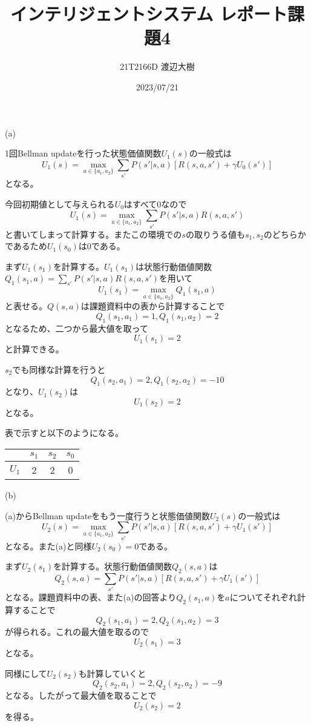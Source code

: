 \documentclass[a4paper,11pt,dvipdfmx]{jsarticle}
\begin{document}
\title{インテリジェントシステム レポート課題4}
\author{21T2166D 渡辺大樹}
\date{2023/07/21}
\maketitle

\section{}
(a)

1回Bellman updateを行った状態価値関数$U_1(s)$の一般式は
\[U_1(s)=\max_{a\in\{a_1,a_2\}}\sum_{s'}P(s'|s,a)[R(s,a,s')+\gamma U_0(s')]\]
となる。

今回初期値として与えられる$U_0$はすべて0なので
\[U_1(s)=\max_{a\in\{a_1,a_2\}}\sum_{s'}P(s'|s,a)R(s,a,s')\]
と書いてしまって計算する。またこの環境での$s$の取りうる値も$s_1,s_2$のどちらかであるため$U_1(s_0)$は0である。

まず$U_1(s_1)$を計算する。$U_1(s_1)$は状態行動価値関数$Q_1(s_1,a)=\sum_{s'}P(s'|s,a)R(s,a,s')$を用いて
\[U_1(s_1)=\max_{a\in\{a_1,a_2\}}Q_1(s_1,a)\]
と表せる。$Q(s,a)$は課題資料中の表から計算することで
\[Q_1(s_1,a_1)=1,Q_1(s_1,a_2)=2\]
となるため、二つから最大値を取って
\[U_1(s_1)=2\]
と計算できる。

$s_2$でも同様な計算を行うと
\[Q_1(s_2,a_1)=2,Q_1(s_2,a_2)=-10\]
となり、$U_1(s_2)$は
\[U_1(s_2)=2\]
となる。

表で示すと以下のようになる。
\begin{center}
    \begin{tabular}[h]{|c|c|c|c|} \hline
              & $s_1$ & $s_2$ & $s_0$ \\ \hline
        $U_1$ &   2   &   2   &   0   \\ \hline
    \end{tabular}
\end{center}

(b)

(a)からBellman updateをもう一度行うと状態価値関数$U_2(s)$の一般式は
\[U_2(s)=\max_{a\in\{a_1,a_2\}}\sum_{s'}P(s'|s,a)[R(s,a,s')+\gamma U_1(s')]\]
となる。また(a)と同様$U_2(s_0)=0$である。

まず$U_2(s_1)$を計算する。状態行動価値関数$Q_2(s,a)$は
\[Q_2(s,a)=\sum_{s'}P(s'|s,a)[R(s,a,s')+\gamma U_1(s')]\]
となる。課題資料中の表、また(a)の回答より$Q_2(s_1,a)$を$a$についてそれぞれ計算することで
\[Q_2(s_1,a_1)=2,Q_2(s_1,a_2)=3\]
が得られる。これの最大値を取るので
\[U_2(s_1)=3\]
となる。

同様にして$U_2(s_2)$も計算していくと
\[Q_2(s_2,a_1)=2,Q_2(s_2,a_2)=-9\]
となる。したがって最大値を取ることで
\[U_2(s_2)=2\]
を得る。
\end{document}
